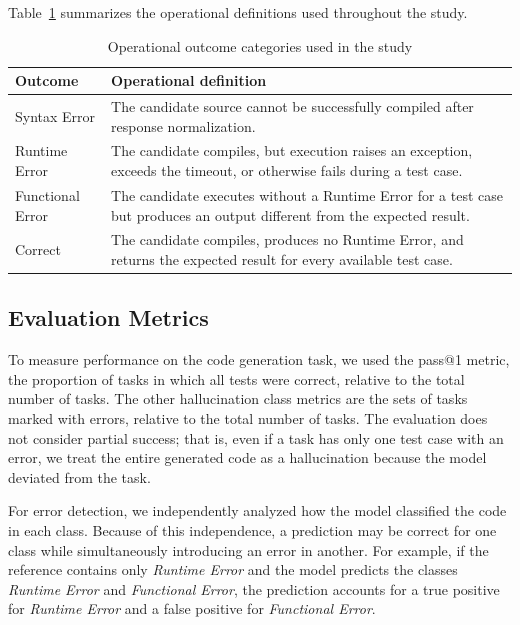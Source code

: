 Table~\ref{tab:error_types} summarizes the operational definitions used throughout the study.

\begin{table}[htbp]
\centering
\caption{Operational outcome categories used in the study}
\label{tab:error_types}
\begin{tabular}{@{}p{}@{}p{}@{}}
\toprule
\textbf{Outcome} & \textbf{Operational definition} \\
\midrule
Syntax Error &
The candidate source cannot be successfully compiled after response normalization. \\
\midrule
Runtime Error &
The candidate compiles, but execution raises an exception, exceeds the timeout, or otherwise fails during a test case. \\
\midrule
Functional Error &
The candidate executes without a Runtime Error for a test case but produces an output different from the expected result. \\
\midrule
Correct &
The candidate compiles, produces no Runtime Error, and returns the expected result for every available test case. \\
\bottomrule
\end{tabular}
\end{table}

\subsection{Evaluation Metrics}

To measure performance on the code generation task, we used the pass@1 metric, the proportion of tasks in which all tests were correct, relative to the total number of tasks. The other hallucination class metrics are the sets of tasks marked with errors, relative to the total number of tasks. The evaluation does not consider partial success; that is, even if a task has only one test case with an error, we treat the entire generated code as a hallucination because the model deviated from the task.

For error detection, we independently analyzed how the model classified the code in each class. Because of this independence, a prediction may be correct for one class while simultaneously introducing an error in another. For example, if the reference contains only \emph{Runtime Error} and the model predicts the classes \emph{Runtime Error} and \emph{Functional Error}, the prediction accounts for a true positive for \emph{Runtime Error} and a false positive for \emph{Functional Error}.

